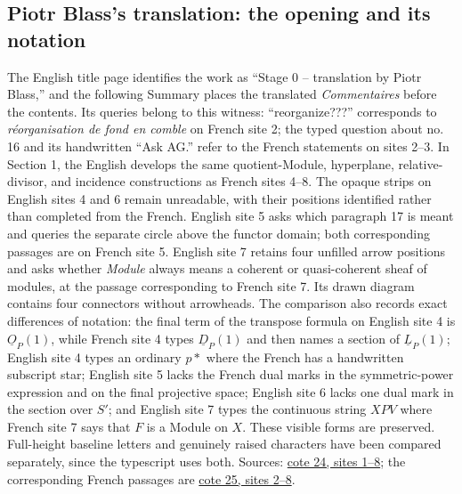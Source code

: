 \subsection*{Piotr Blass's translation: the opening and its notation}
The English title page identifies the work as ``Stage 0 -- translation by Piotr Blass,'' and the following Summary places the translated \emph{Commentaires} before the contents. Its queries belong to this witness: ``reorganize???'' corresponds to \emph{réorganisation de fond en comble} on French site 2; the typed question about no.\,16 and its handwritten ``Ask AG.'' refer to the French statements on sites 2--3. In Section 1, the English develops the same quotient-Module, hyperplane, relative-divisor, and incidence constructions as French sites 4--8. The opaque strips on English sites 4 and 6 remain unreadable, with their positions identified rather than completed from the French. English site 5 asks which paragraph 17 is meant and queries the separate circle above the functor domain; both corresponding passages are on French site 5. English site 7 retains four unfilled arrow positions and asks whether \emph{Module} always means a coherent or quasi-coherent sheaf of modules, at the passage corresponding to French site 7. Its drawn diagram contains four connectors without arrowheads. The comparison also records exact differences of notation: the final term of the transpose formula on English site 4 is $\underline O_P(1)$, while French site 4 types $\underline D_P(1)$ and then names a section of $\underline L_P(1)$; English site 4 types an ordinary $p*$ where the French has a handwritten subscript star; English site 5 lacks the French dual marks in the symmetric-power expression and on the final projective space; English site 6 lacks one dual mark in the section over $S'$; and English site 7 types the continuous string $XPV$ where French site 7 says that $F$ is a Module on $X$. These visible forms are preserved. Full-height baseline letters and genuinely raised characters have been compared separately, since the typescript uses both. Sources: \href{https://grothendieck.umontpellier.fr/web/viewer.html?file=../24.pdf\#page=2}{cote 24, sites 1--8}; the corresponding French passages are \href{https://grothendieck.umontpellier.fr/web/viewer.html?file=../25.pdf\#page=3}{cote 25, sites 2--8}.

